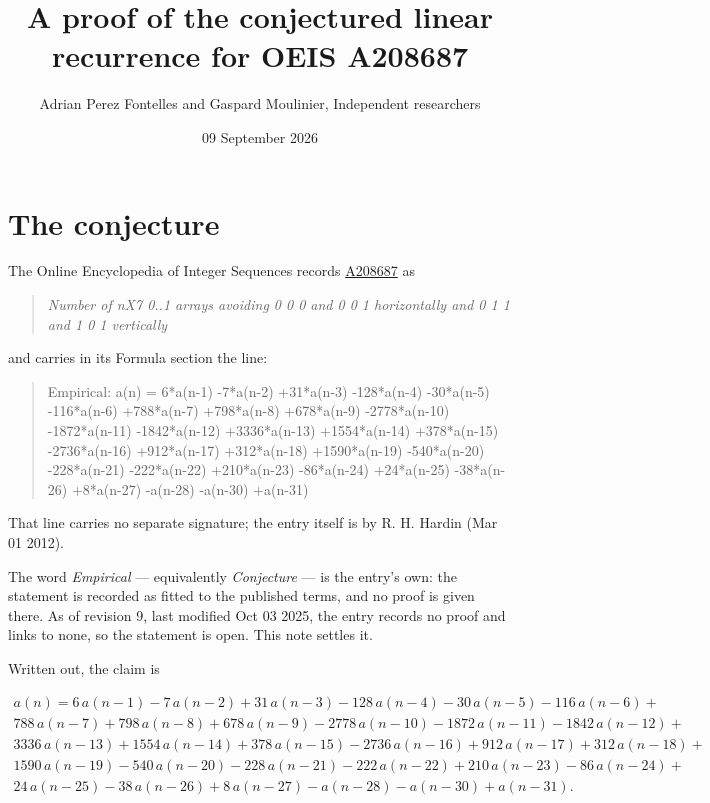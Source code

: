 \documentclass[11pt]{article}
\title{A proof of the conjectured linear recurrence for OEIS A208687}
\author{Adrian Perez Fontelles and Gaspard Moulinier, Independent researchers}
\date{09 September 2026}
\theoremstyle{definition}
\begin{document}
\maketitle
\section{The conjecture}

The Online Encyclopedia of Integer Sequences records \href{https://oeis.org/A208687}{A208687} as

\begin{quote}\itshape Number of nX7 0..1 arrays avoiding 0 0 0 and 0 0 1 horizontally and 0 1 1 and 1 0 1 vertically\end{quote}

and carries in its Formula section the line:

\begin{quote}\ttfamily Empirical: a(n) = 6*a(n-1) -7*a(n-2) +31*a(n-3) -128*a(n-4) -30*a(n-5) -116*a(n-6) +788*a(n-7) +798*a(n-8) +678*a(n-9) -2778*a(n-10) -1872*a(n-11) -1842*a(n-12) +3336*a(n-13) +1554*a(n-14) +378*a(n-15) -2736*a(n-16) +912*a(n-17) +312*a(n-18) +1590*a(n-19) -540*a(n-20) -228*a(n-21) -222*a(n-22) +210*a(n-23) -86*a(n-24) +24*a(n-25) -38*a(n-26) +8*a(n-27) -a(n-28) -a(n-30) +a(n-31)\end{quote}

That line carries no separate signature; the entry itself is by R. H. Hardin (Mar 01 2012).

The word {\itshape Empirical} --- equivalently {\itshape Conjecture} --- is the entry's own: the statement is recorded as fitted to the published terms, and no proof is given there. As of revision 9, last modified Oct 03 2025, the entry records no proof and links to none, so the statement is open. This note settles it.

Written out, the claim is

\begin{multline*} a(n) = 6\,a(n-1) - 7\,a(n-2) + 31\,a(n-3) - 128\,a(n-4) - 30\,a(n-5) - 116\,a(n-6) + \\ 788\,a(n-7) + 798\,a(n-8) + 678\,a(n-9) - 2778\,a(n-10) - 1872\,a(n-11) - 1842\,a(n-12) + \\ 3336\,a(n-13) + 1554\,a(n-14) + 378\,a(n-15) - 2736\,a(n-16) + 912\,a(n-17) + 312\,a(n-18) + \\ 1590\,a(n-19) - 540\,a(n-20) - 228\,a(n-21) - 222\,a(n-22) + 210\,a(n-23) - 86\,a(n-24) + \\ 24\,a(n-25) - 38\,a(n-26) + 8\,a(n-27) - a(n-28) - a(n-30) + a(n-31). \end{multline*}
\end{document}
